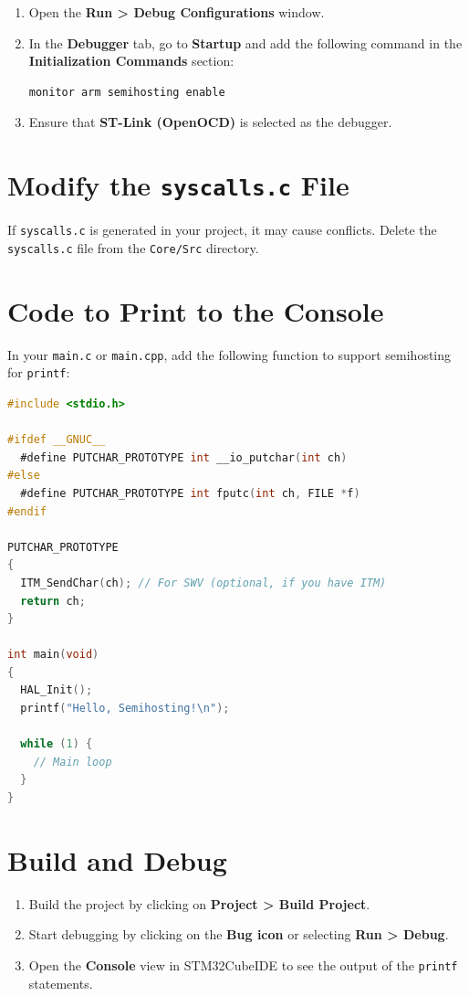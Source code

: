 \documentclass{article}
\begin{document}
\begin{enumerate}
  \item Open the \textbf{Run > Debug Configurations} window.
  \item In the \textbf{Debugger} tab, go to \textbf{Startup} and add the following command in the \textbf{Initialization Commands} section:
  \begin{lstlisting}
monitor arm semihosting enable
  \end{lstlisting}
  \item Ensure that \textbf{ST-Link (OpenOCD)} is selected as the debugger.
\end{enumerate}

\section{Modify the \texttt{syscalls.c} File}

If \texttt{syscalls.c} is generated in your project, it may cause conflicts. Delete the \texttt{syscalls.c} file from the \texttt{Core/Src} directory.

\section{Code to Print to the Console}

In your \texttt{main.c} or \texttt{main.cpp}, add the following function to support semihosting for \texttt{printf}:

\begin{lstlisting}[language=C]
#include <stdio.h>

#ifdef __GNUC__
  #define PUTCHAR_PROTOTYPE int __io_putchar(int ch)
#else
  #define PUTCHAR_PROTOTYPE int fputc(int ch, FILE *f)
#endif

PUTCHAR_PROTOTYPE
{
  ITM_SendChar(ch); // For SWV (optional, if you have ITM)
  return ch;
}

int main(void)
{
  HAL_Init();
  printf("Hello, Semihosting!\n");

  while (1) {
    // Main loop
  }
}
\end{lstlisting}

\section{Build and Debug}

\begin{enumerate}
  \item Build the project by clicking on \textbf{Project > Build Project}.
  \item Start debugging by clicking on the \textbf{Bug icon} or selecting \textbf{Run > Debug}.
  \item Open the \textbf{Console} view in STM32CubeIDE to see the output of the \texttt{printf} statements.
\end{enumerate}
\end{document}
